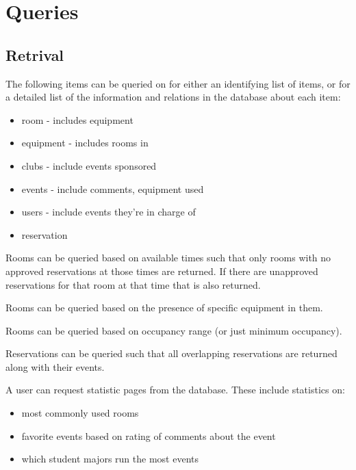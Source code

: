 \documentclass{article}
\begin{document}


%

\section{Queries}
\subsection{Retrival}

The following items can be queried on for either an identifying list of items,
or for a detailed list of the information and relations in the database about each item:
\begin{itemize}
\item room - includes equipment
\item equipment - includes rooms in
\item clubs - include events sponsored 
\item events - include comments, equipment used
\item users - include events they're in charge of
\item reservation 
\end{itemize}

Rooms can be queried based on available times such that only rooms with no approved reservations at those times are returned.
If there are unapproved reservations for that room at that time that is also returned.

Rooms can be queried based on the presence of specific equipment in them.

Rooms can be queried based on occupancy range (or just minimum occupancy).

Reservations can be queried such that all overlapping reservations are returned along with their events.

A user can request statistic pages from the database. These include statistics on:
\begin{itemize}
\item most commonly used rooms
\item favorite events based on rating of comments about the event
\item which student majors run the most events
\end{itemize}
\end{document}
